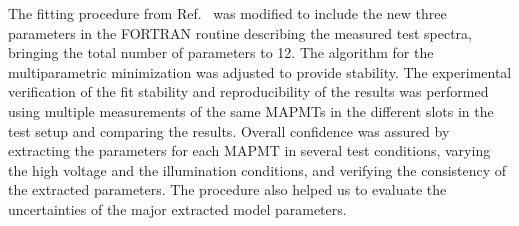 The fitting procedure from Ref.~\cite{DEGTIARENKO20171} was modified to include the new three parameters in the FORTRAN routine describing the measured test spectra, bringing the total number of parameters to 12. The algorithm for the multiparametric minimization was adjusted to provide stability. The experimental verification of the fit stability and reproducibility of the results was performed using multiple measurements of the same MAPMTs in the different slots in the test setup and comparing the results. Overall confidence was assured by extracting the parameters for each MAPMT in several test conditions, varying the high voltage and the illumination conditions, and verifying the consistency of the extracted parameters. The procedure also helped us to evaluate the uncertainties of the major extracted model parameters.
